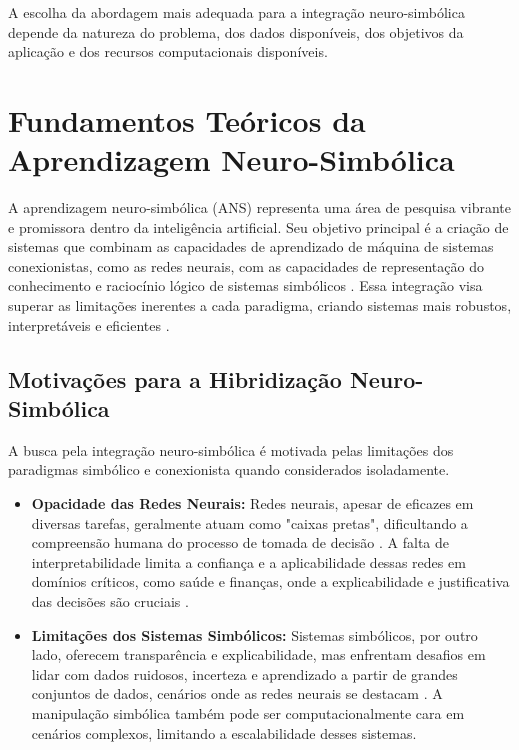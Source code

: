 \documentclass[12pt]{article}
\begin{document}
A escolha da abordagem mais adequada para a integração neuro-simbólica depende da natureza do problema,  dos dados disponíveis,  dos objetivos da aplicação e dos recursos computacionais disponíveis.

\section{Fundamentos Teóricos da Aprendizagem Neuro-Simbólica}

A aprendizagem neuro-simbólica (ANS)  representa uma área de pesquisa vibrante e promissora dentro da inteligência artificial.  Seu objetivo principal é a criação de sistemas que combinam as capacidades de aprendizado de máquina de sistemas conexionistas,  como as redes neurais,  com as capacidades de representação do conhecimento e raciocínio lógico de sistemas simbólicos \cite{garcez2009neural}. Essa integração visa superar as limitações inerentes a cada paradigma,  criando sistemas mais robustos,  interpretáveis e eficientes \cite{besold2017neural}.

\subsection{Motivações para a Hibridização Neuro-Simbólica}

A busca pela integração neuro-simbólica é motivada pelas limitações dos paradigmas simbólico e conexionista quando considerados isoladamente.

\begin{itemize}
\item \textbf{Opacidade das Redes Neurais:} Redes neurais,  apesar de eficazes em diversas tarefas,  geralmente atuam como "caixas pretas",  dificultando a compreensão humana do processo de tomada de decisão \cite{castelvecchi2016can}.  A falta de interpretabilidade limita a confiança e a aplicabilidade dessas redes em domínios críticos,  como saúde e finanças,  onde a explicabilidade e justificativa das decisões são cruciais \cite{guidotti2018survey}.
\item \textbf{Limitações dos Sistemas Simbólicos:} Sistemas simbólicos,  por outro lado,  oferecem transparência e explicabilidade,  mas enfrentam desafios em lidar com dados ruidosos,  incerteza e aprendizado a partir de grandes conjuntos de dados,  cenários onde as redes neurais se destacam \cite{smolensky1988connectionist}.  A manipulação simbólica também pode ser computacionalmente cara em cenários complexos,  limitando a escalabilidade desses sistemas.
\end{itemize}
\end{document}
